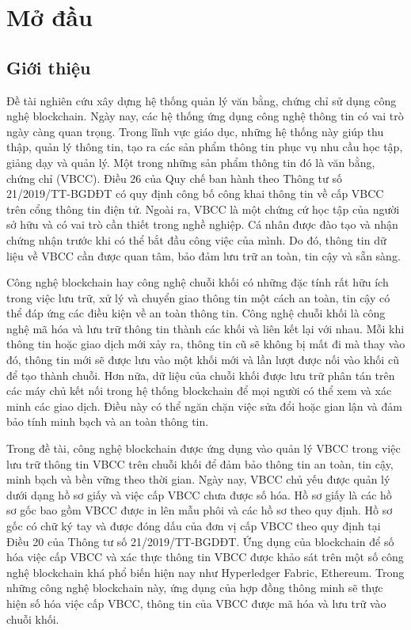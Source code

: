 \chapter{Mở đầu}

\section{Giới thiệu}

Đề tài nghiên cứu xây dựng hệ thống quản lý văn bằng, chứng chỉ sử dụng công nghệ blockchain.
Ngày nay, các hệ thống ứng dụng công nghệ thông tin có vai trò ngày càng quan trọng.
Trong lĩnh vực giáo dục, những hệ thống này giúp thu thập, quản lý thông tin, tạo ra các sản phẩm thông tin phục vụ nhu cầu học tập, giảng dạy và quản lý.
Một trong những sản phẩm thông tin đó là văn bằng, chứng chỉ (VBCC).
Điều 26 của Quy chế ban hành theo Thông tư số 21/2019/TT-BGDĐT  có quy định công bố công khai thông tin về cấp VBCC trên cổng thông tin điện tử.
Ngoài ra, VBCC là một chứng cứ học tập của người sở hữu và có vai trò cần thiết trong nghề nghiệp.
Cá nhân được đào tạo và nhận chứng nhận trước khi có thể bắt đầu công việc của mình.
Do đó, thông tin dữ liệu về VBCC cần được quan tâm, bảo đảm lưu trữ an toàn, tin cậy và sẵn sàng.

Công nghệ blockchain hay công nghệ chuỗi khối có những đặc tính rất hữu ích trong việc lưu trữ, xử lý và chuyển giao thông tin một cách an toàn, tin cậy có thể đáp ứng các điều kiện về an toàn thông tin.
Công nghệ chuỗi khối là công nghệ mã hóa và lưu trữ thông tin thành các khối và liên kết lại với nhau.
Mỗi khi thông tin hoặc giao dịch mới xảy ra, thông tin cũ sẽ không bị mất đi mà thay vào đó, thông tin mới sẽ được lưu vào một khối mới và lần lượt được nối vào khối cũ để tạo thành chuỗi.
Hơn nữa, dữ liệu của chuỗi khối được lưu trữ phân tán trên các máy chủ kết nối trong hệ thống blockchain để mọi người có thể xem và xác minh các giao dịch. Điều này có thể ngăn chặn việc sửa đổi hoặc gian lận và đảm bảo tính minh bạch và an toàn thông tin.

Trong đề tài, công nghệ blockchain được ứng dụng vào quản lý VBCC trong việc lưu trữ thông tin VBCC trên chuỗi khối để đảm bảo thông tin an toàn, tin cậy, minh bạch và bền vững theo thời gian.
Ngày nay, VBCC chủ yếu được quản lý dưới dạng hồ sơ giấy và việc cấp VBCC chưa được số hóa.
Hồ sơ giấy là các hồ sơ gốc bao gồm VBCC được in lên mẫu phôi và các hồ sơ theo quy định. Hồ sơ gốc có chữ ký tay và được đóng dấu của đơn vị cấp VBCC theo quy định tại Điều 20 của Thông tư số 21/2019/TT-BGDĐT.
Ứng dụng của blockchain để số hóa việc cấp VBCC và xác thực thông tin VBCC được khảo sát trên một số công nghệ blockchain khá phổ biến hiện nay như Hyperledger Fabric, Ethereum.
Trong những công nghệ blockchain này, ứng dụng của hợp đồng thông minh sẽ thực hiện số hóa việc cấp VBCC, thông tin của VBCC được mã hóa và lưu trữ vào chuỗi khối.

